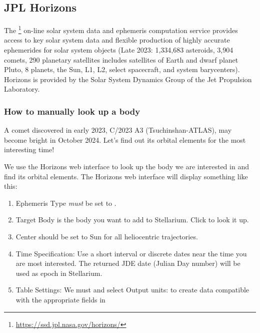 \subsection{JPL Horizons}
\label{sec:ssystem.ini:JPLHorizons}


The \footnote{\url{https://ssd.jpl.nasa.gov/horizons/}} on-line solar system data and ephemeris computation service provides access to key solar system data and 
flexible production of highly accurate ephemerides for solar system objects (Late 2023: 1,334,683 asteroids, 3,904 comets, 290 planetary satellites {includes satellites of Earth and dwarf planet Pluto}, 
8 planets, the Sun, L1, L2, select spacecraft, and system barycenters). Horizons is provided by the Solar System Dynamics Group of the Jet Propulsion Laboratory.

\subsubsection{How to manually look up a body}

A comet discovered in early 2023, C/2023 A3 (Tsuchinshan-ATLAS), may become bright in October 2024. 
Let's find out its orbital elements for the most interesting time! 

We use the Horizons web interface to look up the body we are interested in and find its orbital elements. 
The Horizons web interface will display something like this:\vspace{\baselineskip}

\vspace{\baselineskip}

\begin{enumerate}
\item Ephemeris Type \emph{must} be set to .
\item Target Body is the body you want to add to Stellarium. Click  to look it up.
\item Center should be set to  Sun for all heliocentric trajectories.
\item Time Specification: Use a short interval or discrete dates near the time you are most interested. The returned JDE date (Julian Day number) will be used as epoch in Stellarium.
\item Table Settings: We must  and select Output units:  to create data compatible with the appropriate fields in 
\end{enumerate}

